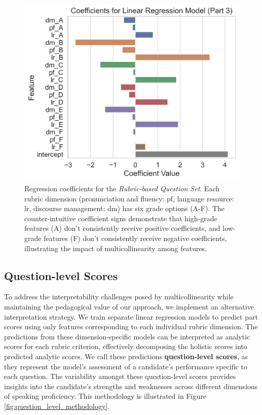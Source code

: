 \documentclass{report}
\begin{document}
\begin{figure}[h]
  \centering
  \includegraphics[width=0.8\linewidth]{images/coefficients.png}
  \caption{Regression coefficients for the \emph{Rubric-based Question Set}. Each rubric dimension (pronunciation and fluency: pf, language resource: lr, discourse management: dm) has six grade options (A-F). The counter-intuitive coefficient signs demonstrate that high-grade features (A) don't consistently receive positive coefficients, and low-grade features (F) don't consistently receive negative coefficients, illustrating the impact of multicollinearity among features.}
  \label{fig:regression_coefficients}
\end{figure}

\subsection{Question-level Scores}
\label{subsec:question_scores}
To address the interpretability challenges posed by multicollinearity while maintaining the pedagogical value of our approach, we implement an alternative interpretation strategy. We train separate linear regression models to predict part scores using only features corresponding to each individual rubric dimension. The predictions from these dimension-specific models can be interpreted as analytic scores for each rubric criterion, effectively decomposing the holistic scores into predicted analytic scores. We call these predictions \textbf{question-level scores}, as they represent the model's assessment of a candidate's performance specific to each question. The variability amongst these question-level scores provides insights into the candidate's strengths and weaknesses across different dimensions of speaking proficiency. This methodology is illustrated in Figure \ref{fig:question_level_methodology}.
\end{document}
